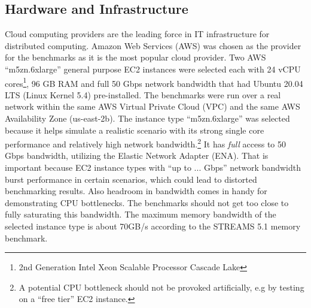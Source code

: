 \subsection{Hardware and Infrastructure}
Cloud computing providers are the leading force in IT infrastructure for distributed computing. Amazon Web Services (AWS) was chosen as the provider for the benchmarks as it is the most popular cloud provider. \newline
Two AWS “m5zn.6xlarge” general purpose EC2 instances were selected each with 24 vCPU cores\footnote{2nd Generation Intel Xeon Scalable Processor Cascade Lake}, 96 GB RAM and full 50 Gbps network bandwidth that had Ubuntu 20.04 LTS (Linux Kernel 5.4) pre-installed. The benchmarks were run over a real network within the same AWS Virtual Private Cloud (VPC) and the same AWS Availability Zone (us-east-2b). \newline
The instance type “m5zn.6xlarge” was selected because it helps simulate a realistic scenario with its strong single core performance and relatively high network bandwidth.\footnote{A potential CPU bottleneck should not be provoked artificially, e.g by testing on a “free tier” EC2 instance.} It has \textit{full} access to 50 Gbps bandwidth, utilizing the Elastic Network Adapter (ENA). That is important because EC2 instance types with “up to ... Gbps” network bandwidth burst performance in certain scenarios, which could lead to distorted benchmarking results. Also headroom in bandwidth comes in handy for demonstrating CPU bottlenecks. The benchmarks should not get too close to fully saturating this bandwidth. The maximum memory bandwidth of the selected instance type is about 70GB/s according to the STREAMS 5.1 memory benchmark.

